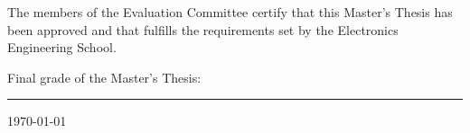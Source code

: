 \vfill

The members of the Evaluation Committee certify that this Master's Thesis has 
been approved and that fulfills the requirements set by the Electronics 
Engineering School.

\vfill

\begin{center}
 Final grade of the Master's Thesis:\rule{3cm}{0.5pt}
\end{center}
\vfill

\begin{center}
   \today\par
\end{center}

\cleardoublepage

